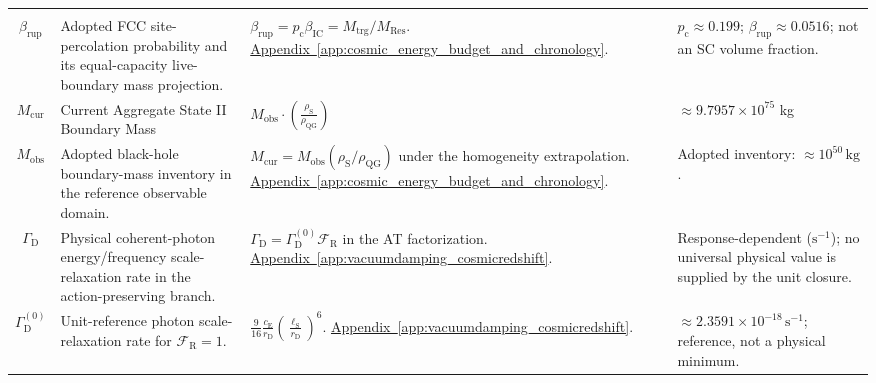 \begin{longtable}{@{} c p{5.5cm} p{4cm} p{3.5cm} @{}}
\begin{tabular}[c]{@{}c@{}}$p_{\mathrm c}$ \\ $\beta_{\mathrm{rup}}$\end{tabular} & {\raggedright Adopted FCC site-percolation probability and its equal-capacity live-boundary mass projection.\par} & {\raggedright $\beta_{\mathrm{rup}}=p_{\mathrm c}\beta_{\mathrm{IC}}=M_{\mathrm{trg}}/M_{\mathrm{Res}}$. \newline \hyperref[app:cosmic_energy_budget_and_chronology]{Appendix~\ref*{app:cosmic_energy_budget_and_chronology}}.\par} & {\raggedright $p_{\mathrm c}\approx0.199$; $\beta_{\mathrm{rup}}\approx0.0516$; not an SC volume fraction.\par} \\


$M_{\mathrm{cur}}$ & Current Aggregate State II Boundary Mass & $M_{\mathrm{obs}} \cdot \left(\frac{\rho_{\mathrm{S}}}{\rho_{\mathrm{QG}}}\right)$ & $\approx 9.7957 \times 10^{75}$ kg \\

$M_{\mathrm{obs}}$ & {\raggedright Adopted black-hole boundary-mass inventory in the reference observable domain.\par} & {\raggedright $M_{\mathrm{cur}}=M_{\mathrm{obs}}(\rho_{\mathrm S}/\rho_{\mathrm{QG}})$ under the homogeneity extrapolation. \newline \hyperref[app:cosmic_energy_budget_and_chronology]{Appendix~\ref*{app:cosmic_energy_budget_and_chronology}}.\par} & {\raggedright Adopted inventory: $\approx10^{50}\,\mathrm{kg}$.\par} \\


$\Gamma_{\mathrm D}$ & {\raggedright Physical coherent-photon energy/frequency scale-relaxation rate in the action-preserving branch.\par} & {\raggedright $\Gamma_{\mathrm D}=\Gamma_{\mathrm D}^{(0)}\mathcal F_{\mathrm R}$ in the AT factorization. \newline \hyperref[app:vacuumdamping_cosmicredshift]{Appendix~\ref*{app:vacuumdamping_cosmicredshift}}.\par} & {\raggedright Response-dependent ($\mathrm{s^{-1}}$); no universal physical value is supplied by the unit closure.\par} \\

$\Gamma_{\mathrm D}^{(0)}$ & {\raggedright Unit-reference photon scale-relaxation rate for $\mathcal F_{\mathrm R}=1$.\par} & {\raggedright $\frac9{16}\frac{c_{\mathrm E}}{r_{\mathrm D}}\left(\frac{\ell_{\mathrm S}}{r_{\mathrm D}}\right)^6$. \newline \hyperref[app:vacuumdamping_cosmicredshift]{Appendix~\ref*{app:vacuumdamping_cosmicredshift}}.\par} & {\raggedright $\approx2.3591\times10^{-18}\,\mathrm{s^{-1}}$; reference, not a physical minimum.\par} \\


\end{longtable}
